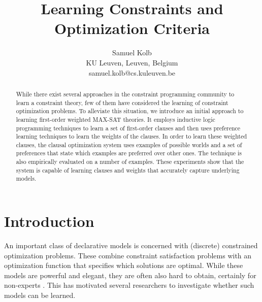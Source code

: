 \documentclass[letterpaper]{article}
\title{Learning Constraints and Optimization Criteria}
\author{
  Samuel Kolb\\
  KU Leuven, Leuven, Belgium\\
  samuel.kolb@cs.kuleuven.be
}
\theoremstyle{definition}
\newcommand{\sam}[1]{{\color{red}(#1)}}
\begin{document}
\maketitle

\begin{abstract}
While there exist several approaches in the constraint programming community to learn a constraint theory, few of them have considered the learning of constraint optimization problems.
To alleviate this situation, we introduce an initial approach to learning first-order weighted MAX-SAT theories. 
It employs inductive logic programming techniques to learn a set of first-order clauses and then uses preference learning techniques to learn the weights of the clauses.
In order to learn these weighted clauses, the clausal optimization system uses examples of possible worlds and a set of preferences that state which examples are preferred over other ones.
The technique is also empirically evaluated on a number of examples.
These experiments show that the system is capable of learning clauses and weights that accurately capture underlying models.
\end{abstract}



\section{Introduction}
An important class of declarative models is concerned with (discrete) constrained optimization problems.
These combine constraint satisfaction problems with an optimization function that specifies which solutions are optimal.
While these models are powerful and elegant, they are often also hard to obtain, certainly for non-experts \cite{Wallace:PrinciplesCP}.
This has motivated several researchers to investigate whether such models can be learned. 
\end{document}
